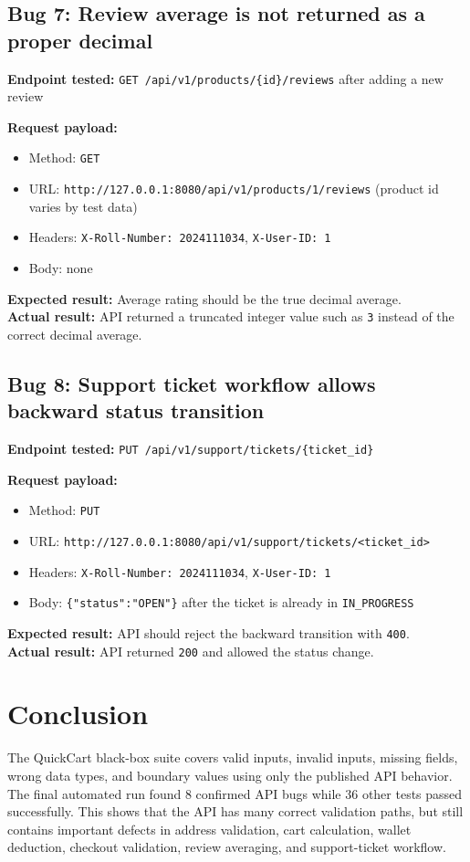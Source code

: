 \documentclass[12pt]{article}
\begin{document}
\subsection{Bug 7: Review average is not returned as a proper decimal}
\textbf{Endpoint tested:} \texttt{GET /api/v1/products/\{id\}/reviews} after adding a new review

\textbf{Request payload:}
\begin{itemize}
    \item Method: \texttt{GET}
    \item URL: \texttt{http://127.0.0.1:8080/api/v1/products/1/reviews} (product id varies by test data)
    \item Headers: \texttt{X-Roll-Number: 2024111034}, \texttt{X-User-ID: 1}
    \item Body: none
\end{itemize}
\textbf{Expected result:} Average rating should be the true decimal average.\\
\textbf{Actual result:} API returned a truncated integer value such as \texttt{3} instead of the correct decimal average.

\subsection{Bug 8: Support ticket workflow allows backward status transition}
\textbf{Endpoint tested:} \texttt{PUT /api/v1/support/tickets/\{ticket\_id\}}

\textbf{Request payload:}
\begin{itemize}
    \item Method: \texttt{PUT}
    \item URL: \texttt{http://127.0.0.1:8080/api/v1/support/tickets/<ticket\_id>}
    \item Headers: \texttt{X-Roll-Number: 2024111034}, \texttt{X-User-ID: 1}
    \item Body: \texttt{\{"status":"OPEN"\}} after the ticket is already in \texttt{IN\_PROGRESS}
\end{itemize}
\textbf{Expected result:} API should reject the backward transition with \texttt{400}.\\
\textbf{Actual result:} API returned \texttt{200} and allowed the status change.

\section{Conclusion}
The QuickCart black-box suite covers valid inputs, invalid inputs, missing fields, wrong data types, and boundary values using only the published API behavior. The final automated run found 8 confirmed API bugs while 36 other tests passed successfully. This shows that the API has many correct validation paths, but still contains important defects in address validation, cart calculation, wallet deduction, checkout validation, review averaging, and support-ticket workflow.
\end{document}

